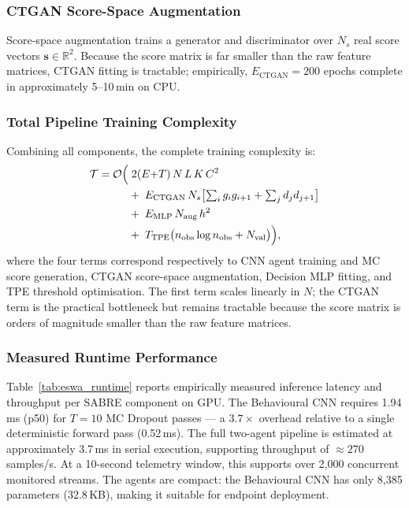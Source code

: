 \subsubsection*{CTGAN Score-Space Augmentation}

Score-space augmentation trains a generator and discriminator over $N_s$ real score vectors $\mathbf{s} \in \mathbb{R}^{2}$. Because the score matrix is far smaller than the raw feature matrices, CTGAN fitting is tractable; empirically, $E_\text{CTGAN} = 200$ epochs complete in approximately 5--10\,min on CPU.

\subsubsection*{Total Pipeline Training Complexity}

Combining all components, the complete training complexity is:
\begin{align}
\mathcal{T} = \mathcal{O}\Bigl(
  &\;2(E{+}T)\,N\,L\,K\,C^2 \nonumber\\
  &+\; E_\text{CTGAN}\,N_s \bigl[\textstyle\sum_i g_i g_{i+1} + \sum_j d_j d_{j+1}\bigr] \nonumber\\
  &+\; E_\text{MLP}\,N_\text{aug}\,h^2 \nonumber\\
  &+\; T_\text{TPE} \bigl(n_\text{obs}\log n_\text{obs} + N_\text{val}\bigr)
\Bigr),
\label{eq:eswa_total_complexity}
\end{align}
where the four terms correspond respectively to CNN agent training and MC score generation, CTGAN score-space augmentation, Decision MLP fitting, and TPE threshold optimisation. The first term scales linearly in $N$; the CTGAN term is the practical bottleneck but remains tractable because the score matrix is orders of magnitude smaller than the raw feature matrices.

\subsubsection*{Measured Runtime Performance}

Table~\ref{tab:eswa_runtime} reports empirically measured inference latency and throughput per SABRE component on GPU. The Behavioural CNN requires 1.94\,ms (p50) for $T=10$ MC Dropout passes — a $3.7\times$ overhead relative to a single deterministic forward pass (0.52\,ms). The full two-agent pipeline is estimated at approximately 3.7\,ms in serial execution, supporting throughput of $\approx 270$ samples/s. At a 10-second telemetry window, this supports over 2,000 concurrent monitored streams. The agents are compact: the Behavioural CNN has only 8,385 parameters (32.8\,KB), making it suitable for endpoint deployment.

